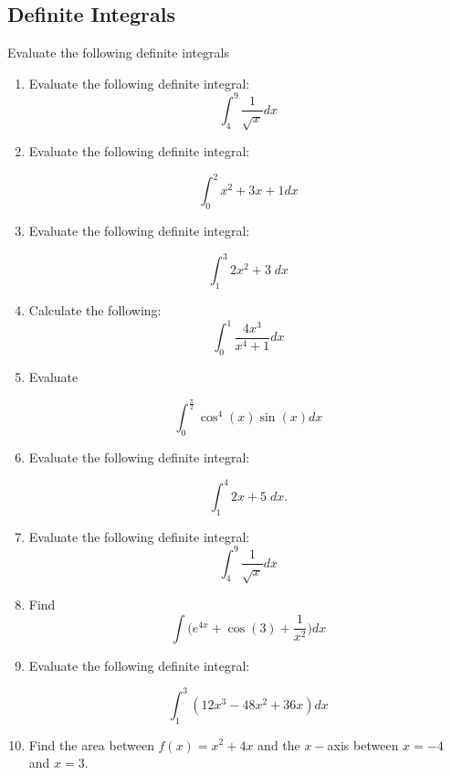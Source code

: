 \documentclass[a4paper,12pt]{article}
\begin{document}
\subsection*{Definite Integrals}
Evaluate the following definite integrals 

	
\begin{enumerate}


	\item Evaluate the following definite integral: 
	\[\int^{9}_{4} \frac{1}{\sqrt{x}} dx\] 
\item Evaluate the following definite integral:

\[  \int^{2}_{0}  x^2+3x+1 dx  \]
\item Evaluate the following definite integral:

\[  \int^{3}_{1}  2x^2+3\; dx  \]

	\item Calculate the following:
	\[ \int^{1}_{0} \frac{4x^3}{x^4+1} dx \]
	
	
	\item Evaluate 
	
	\[ \int^{\frac{\pi}{2}}_{0} \cos^4(x) \sin(x) dx \]

	\item Evaluate the following definite integral:
	
	\[  \int^{4}_{1}  2x+5\; dx.  \]
	\smallskip
	\item Evaluate the following definite integral: 
	\[\int^{9}_{4} \frac{1}{\sqrt{x}} dx\] 
	\item Find \[\int \bigg(e^{4x} + \cos(3) + \frac{1}{x^2} \bigg)dx\]
\item Evaluate the following definite integral:

\[  \int^3_1 (12x^3 -48x^2 +36x) dx \]	
	\item 
	Find the area between $f(x) = x^2 + 4x $ and the $x-$axis between 
	$x=-4$   and $ x=3$.
	

\end{enumerate}
\end{document}
